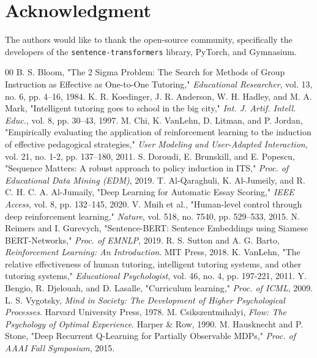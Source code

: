 \documentclass[conference]{IEEEtran}
\begin{document}
\section*{Acknowledgment}
The authors would like to thank the open-source community, specifically the developers of the \texttt{sentence-transformers} library, PyTorch, and Gymnasium.

\begin{thebibliography}{00}
 B. S. Bloom, "The 2 Sigma Problem: The Search for Methods of Group Instruction as Effective as One-to-One Tutoring," \textit{Educational Researcher}, vol. 13, no. 6, pp. 4–16, 1984.
 K. R. Koedinger, J. R. Anderson, W. H. Hadley, and M. A. Mark, "Intelligent tutoring goes to school in the big city," \textit{Int. J. Artif. Intell. Educ.}, vol. 8, pp. 30–43, 1997.
 M. Chi, K. VanLehn, D. Litman, and P. Jordan, "Empirically evaluating the application of reinforcement learning to the induction of effective pedagogical strategies," \textit{User Modeling and User-Adapted Interaction}, vol. 21, no. 1-2, pp. 137–180, 2011.
 S. Doroudi, E. Brunskill, and E. Popescu, "Sequence Matters: A robust approach to policy induction in ITS," \textit{Proc. of Educational Data Mining (EDM)}, 2019.
 T. Al-Qaraghuli, K. Al-Jumeily, and R. C. H. C. A. Al-Jumaily, "Deep Learning for Automatic Essay Scoring," \textit{IEEE Access}, vol. 8, pp. 132–145, 2020.
 V. Mnih et al., "Human-level control through deep reinforcement learning," \textit{Nature}, vol. 518, no. 7540, pp. 529–533, 2015.
 N. Reimers and I. Gurevych, "Sentence-BERT: Sentence Embeddings using Siamese BERT-Networks," \textit{Proc. of EMNLP}, 2019.
 R. S. Sutton and A. G. Barto, \textit{Reinforcement Learning: An Introduction}. MIT Press, 2018.
 K. VanLehn, "The relative effectiveness of human tutoring, intelligent tutoring systems, and other tutoring systems," \textit{Educational Psychologist}, vol. 46, no. 4, pp. 197-221, 2011.
 Y. Bengio, R. Djelouah, and D. Lasalle, "Curriculum learning," \textit{Proc. of ICML}, 2009.
 L. S. Vygotsky, \textit{Mind in Society: The Development of Higher Psychological Processes}. Harvard University Press, 1978.
 M. Csikszentmihalyi, \textit{Flow: The Psychology of Optimal Experience}. Harper \& Row, 1990.
 M. Hausknecht and P. Stone, "Deep Recurrent Q-Learning for Partially Observable MDPs," \textit{Proc. of AAAI Fall Symposium}, 2015.

\end{thebibliography}
\end{document}
